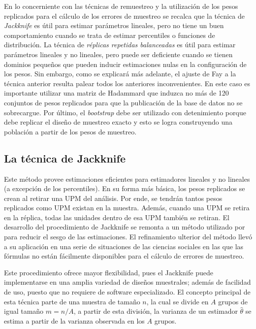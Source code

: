 \documentclass[
  12pt,
]{book}
\begin{document}
En lo concerniente con las técnicas de remuestreo y la utilización de los pesos replicados para el cálculo de los errores de muestreo se recalca que la técnica de \emph{Jackknife} es útil para estimar parámetros lineales, pero no tiene un buen comportamiento cuando se trata de estimar percentiles o funciones de distribución. La técnica de \emph{réplicas repetidas balanceadas} es útil para estimar parámetros lineales y no lineales, pero puede ser deficiente cuando se tienen dominios pequeños que pueden inducir estimaciones nulas en la configuración de los pesos. Sin embargo, como se explicará más adelante, el ajuste de Fay a la técnica anterior resulta palear todos los anteriores inconvenientes. En este caso es importante utilizar una matriz de Hadammard que induzca no más de 120 conjuntos de pesos replicados para que la publicación de la base de datos no se sobrecargue. Por último, el \emph{bootstrap} debe ser utilizado con detenimiento porque debe replicar el diseño de muestreo exacto y esto se logra construyendo una población a partir de los pesos de muestreo.

\hypertarget{la-tuxe9cnica-de-jackknife}{%
\subsection{La técnica de Jackknife}\label{la-tuxe9cnica-de-jackknife}}

Este método provee estimaciones eficientes para estimadores lineales y no lineales (a excepción de los percentiles). En su forma más básica, los pesos replicados se crean al retirar una UPM del análisis. Por ende, se tendrán tantos pesos replicados como UPM existan en la muestra. Además, cuando una UPM se retira en la réplica, todas las unidades dentro de esa UPM también se retiran. El desarrollo del procedimiento de Jackknife se remonta a un método utilizado por \citet{Quenouille} para reducir el sesgo de las estimaciones. El refinamiento ulterior del método \citep{mosteller1968data} llevó a su aplicación en una serie de situaciones de las ciencias sociales en las que las fórmulas no están fácilmente disponibles para el cálculo de errores de muestreo.

Este procedimiento ofrece mayor flexibilidad, pues el Jackknife puede implementarse en una amplia variedad de diseños muestrales; además de facilidad de uso, puesto que no requiere de software especializado. El concepto principal de esta técnica parte de una muestra de tamaño \(n\), la cual se divide en \(A\) grupos de igual tamaño \(m=n/A\), a partir de esta división, la varianza de un estimador \(\hat{\theta}\) se estima a partir de la varianza observada en los \(A\) grupos.
\end{document}
